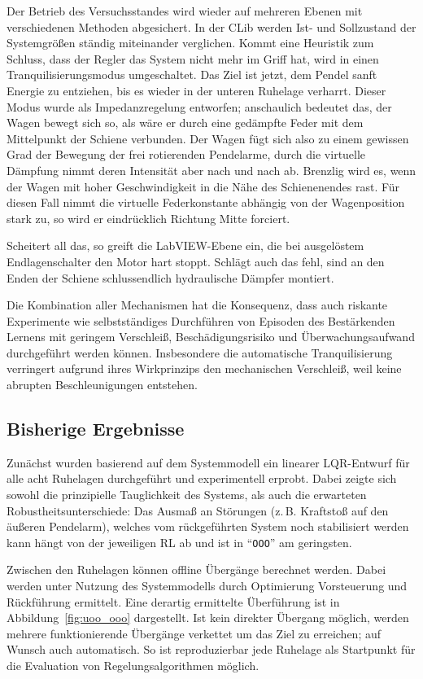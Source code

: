 \documentclass[a4paper,10pt]{scrartcl}
\begin{document}
Der Betrieb des Versuchsstandes wird wieder auf mehreren Ebenen mit verschiedenen Methoden abgesichert. In der CLib werden Ist- und Sollzustand der Systemgrößen ständig miteinander verglichen. Kommt eine Heuristik zum Schluss, dass der Regler das System nicht mehr im Griff hat, wird in einen Tranquilisierungsmodus umgeschaltet. Das Ziel ist jetzt, dem Pendel sanft Energie zu entziehen, bis es wieder in der unteren Ruhelage verharrt. Dieser Modus wurde als Impedanzregelung entworfen; anschaulich bedeutet das, der Wagen bewegt sich so, als wäre er durch eine gedämpfte Feder mit dem Mittelpunkt der Schiene verbunden. Der Wagen fügt sich also zu einem gewissen Grad der Bewegung der frei rotierenden Pendelarme, durch die virtuelle Dämpfung nimmt deren Intensität aber nach und nach ab. Brenzlig wird es, wenn der Wagen mit hoher Geschwindigkeit in die Nähe des Schienenendes rast. Für diesen Fall nimmt die virtuelle Federkonstante abhängig von der Wagenposition stark zu, so wird er eindrücklich Richtung Mitte forciert.

Scheitert all das, so greift die LabVIEW-Ebene ein, die bei ausgelöstem Endlagenschalter den Motor hart stoppt. Schlägt auch das fehl, sind an den Enden der Schiene schlussendlich hydraulische Dämpfer montiert.

Die Kombination aller Mechanismen hat die Konsequenz, dass auch riskante Experimente wie selbstständiges Durchführen von Episoden des Bestärkenden Lernens mit geringem Verschleiß, Beschädigungsrisiko und Überwachungsaufwand durchgeführt werden können. Insbesondere die automatische Tranquilisierung verringert aufgrund ihres Wirkprinzips den mechanischen Verschleiß, weil keine abrupten Beschleunigungen entstehen.

\subsection{Bisherige Ergebnisse}

Zunächst wurden basierend auf dem Systemmodell ein linearer LQR-Entwurf für alle acht Ruhelagen durchgeführt und experimentell erprobt. Dabei zeigte sich sowohl die prinzipielle Tauglichkeit des Systems, als auch die erwarteten Robustheitsunterschiede: Das Ausmaß an Störungen (z.\,B. Kraftstoß auf den äußeren Pendelarm), welches vom rückgeführten System noch stabilisiert werden kann hängt von der jeweiligen RL ab und ist in "`\texttt{OOO}"' am geringsten.
    
\medskip
    
Zwischen den Ruhelagen können offline Übergänge berechnet werden. Dabei werden unter Nutzung des Systemmodells durch Optimierung Vorsteuerung und Rückführung ermittelt.
Eine derartig ermittelte Überführung ist in Abbildung~\ref{fig:uoo_ooo} dargestellt.
Ist kein direkter Übergang möglich, werden mehrere funktionierende Übergänge verkettet um das Ziel zu erreichen; auf Wunsch auch automatisch. So ist reproduzierbar jede Ruhelage als Startpunkt für die Evaluation von Regelungsalgorithmen möglich.
\end{document}
